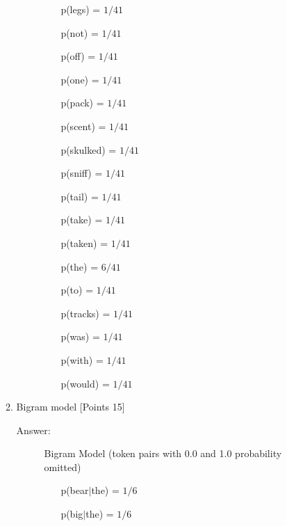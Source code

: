 \documentclass[12pt]{article}
\begin{document}
\begin{enumerate}
\begin{description}
\begin{enumerate}
\begin{description}
\begin{enumerate}
                                        \item[p(legs) =] $1/41$
                                        \item[p(not) =] $1/41$
                                        \item[p(off) =] $1/41$
                                        \item[p(one) =] $1/41$
                                        \item[p(pack) =] $1/41$
                                        \item[p(scent) =] $1/41$
                                        \item[p(skulked) =] $1/41$
                                        \item[p(sniff) =] $1/41$
                                        \item[p(tail) =] $1/41$
                                        \item[p(take) =] $1/41$
                                        \item[p(taken) =] $1/41$
                                        \item[p(the) =] $6/41$
                                        \item[p(to) =] $1/41$
                                        \item[p(tracks) =] $1/41$
                                        \item[p(was) =] $1/41$
                                        \item[p(with) =] $1/41$
                                        \item[p(would) =] $1/41$
                                    \end{enumerate}
                            \end{description}
                      \item Bigram model [Points 15]
                            \begin{description}
                                \item[Answer:] Bigram Model (token pairs with
                                    0.0 and 1.0 probability omitted)
                                    \begin{enumerate}
                                        \item[p(bear$|$the) =] $1/6$
                                        \item[p(big$|$the) =] $1/6$

\end{enumerate}
\end{description}
\end{enumerate}
\end{description}
\end{enumerate}
\end{document}
